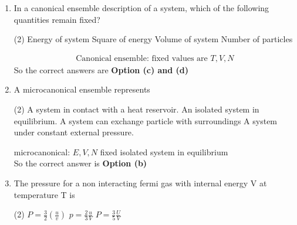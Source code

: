 \begin{enumerate}
\begin{tasks}
		\task[\textbf{c.}]Is a maximum in equilibrium .
		\task[\textbf{d.}] Is a minimum in equilibrium .
	\end{tasks}
	\begin{answer}
		\begin{align*}
		E, U, N \rightarrow& \text{ micro canonical ensemble}\\
		S&=K \ln T(E, V, N)\\
		\text{maximum when }&\text{$\Gamma$ is maximum}\\
		\text{In equilibrium } &s \rightarrow\text{ maximum}\\
		\Rightarrow &r \rightarrow \text { maximum }
		\end{align*}
		So the correct answer is \textbf{Option (c)}
	\end{answer}
	\item In a canonical ensemble description of a system, which of the following quantities remain fixed?
	\begin{tasks}(2)
		\task[\textbf{a.}]Energy of system 
		\task[\textbf{b.}]Square of energy
		\task[\textbf{c.}]Volume of system
		\task[\textbf{d.}] Number of particles
	\end{tasks}
	\begin{answer}
		\begin{align*}
		\text{Canonical ensemble:
			fixed values are }T, V, N
		\end{align*}
		So the correct answers are \textbf{Option (c) and (d)}
	\end{answer}
	\item A microcanonical ensemble represents
	\begin{tasks}(2)
		\task[\textbf{a.}]A system in contact with a heat reservoir.
		\task[\textbf{b.}]An isolated system in equilibrium.
		\task[\textbf{c.}]A system can exchange particle with surroundings
		\task[\textbf{d.}]A system under constant external pressure. 
	\end{tasks}
	\begin{answer}
		microcanonical: $E, V, N$ fixed isolated system in equilibrium\\
		So the correct answer is \textbf{Option (b)}
	\end{answer}
	\item The pressure for a non interacting fermi gas with internal energy V at temperature T is 
	\begin{tasks}(2)
		\task[\textbf{a.}]$P=\frac{3}{2}\left(\frac{u}{v}\right)$
		\task[\textbf{b.}]$p=\frac{2}{3} \frac{u}{V}$
		\task[\textbf{c.}]$ P=\frac{3}{5} \frac{U}{V}$

\end{tasks}
\end{enumerate}
